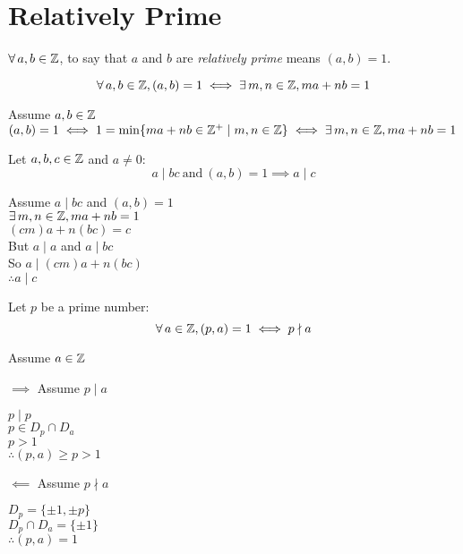\documentclass[letterpaper,12pt,fleqn]{article}
\begin{document}
\section*{Relatively Prime}

\begin{definition}
  $\forall\,a,b\in\mathbb{Z}$, to say that $a$ and $b$ are \emph{relatively prime}
  means $(a,b)=1$.
\end{definition}

\begin{corollary}[To B\'ezout]
  \listbreak
  \[\forall\,a,b\in\mathbb{Z},(a,b)=1\iff\exists\,m,n\in\mathbb{Z},ma+nb=1\]
\end{corollary}

\begin{theproof}
  Assume $a,b\in\mathbb{Z}$ \\
  $(a,b)=1\iff1=\min\{ma+nb\in\mathbb{Z}^+\mid m,n\in\mathbb{Z}\}\iff\exists\,m,n\in\mathbb{Z},ma+nb=1$
\end{theproof}

\begin{theorem}
  Let $a,b,c\in\mathbb{Z}$ and $a\ne0$:
  \[a\mid bc\ \mbox{and}\ (a,b)=1\implies a\mid c\]
\end{theorem}

\begin{theproof}
  Assume $a\mid bc$ and $(a,b)=1$ \\
  $\exists\,m,n\in\mathbb{Z},ma+nb=1$ \\
  $(cm)a+n(bc)=c$ \\
  But $a\mid a$ and $a\mid bc$ \\
  So $a\mid(cm)a+n(bc)$ \\
  $\therefore a\mid c$
\end{theproof}

\begin{theorem}
  Let $p$ be a prime number:
  \[\forall\,a\in\mathbb{Z},(p,a)=1\iff p\nmid a\]
\end{theorem}

\begin{theproof}
  Assume $a\in\mathbb{Z}$

  \begin{description}
  \item $\implies$ Assume $p\mid a$

    $p\mid p$ \\
    $p\in D_p\cap D_a$ \\
    $p>1$ \\
    $\therefore (p,a)\ge p>1$

  \item $\impliedby$ Assume $p\nmid a$

    $D_p=\{\pm1,\pm p\}$ \\
    $D_p\cap D_a=\{\pm1\}$ \\
    $\therefore (p,a)=1$
  \end{description}
\end{theproof}
\end{document}

